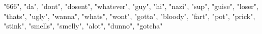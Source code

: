 "666", "da", "dont", "dosent", "whatever", "guy", "hi", "nazi", "sup", "guise",
"loser", "thats", "ugly", "wanna", "whats", "wont", "gotta", "bloody", "fart",
"pot", "prick", "stink", "smells", "smelly", "alot", "dunno", "gotcha"
